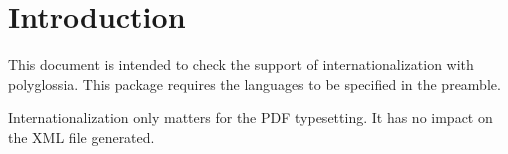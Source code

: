 \documentclass{article}
\def\do#1{\setmainlanguage{#1}\let\do=\setotherlanguage}
\begin{document}
\section*{Introduction}
This document is intended to check the support of 
internationalization with \textsf{polyglossia}. This 
package requires the languages to be specified in the 
preamble.

Internationalization only matters for the PDF typesetting. 
It has no impact on the XML file generated.

\def\do#1{
\begin{#1}
\begin{abstract}#1/\languagename\end{abstract}
\begin{quiz}{#1}
\begin{description}[tags={#1}]{Description}Text\end{description}
\begin{cloze}{Cloze}
\begin{multi}[shuffle]{Multichoice}?\item* A\item B\end{multi}
\begin{multi}[multiple,shuffle=false]{Multianswer}?\item* A\item B\end{multi}
\begin{numerical}{Numerical}?\item0\end{numerical}
\begin{shortanswer}[usecase]{Shortanswer}?\item0\end{shortanswer}
\begin{shortanswer}[usecase=false]{Shortanswer}?\item0\end{shortanswer}
\end{cloze}
\begin{essay}[template={Default}]{Essay}Text\item Info\end{essay}
\begin{essay}[response format=html+file]{Essay}Text\end{essay}
\begin{essay}[response format=text]{Essay}Text\end{essay}
\begin{essay}[response format=monospaced]{Essay}Text\end{essay}
\begin{essay}[response format=file]{Essay}Text\end{essay}

\end{quiz}
\end{#1}}
\end{document}
